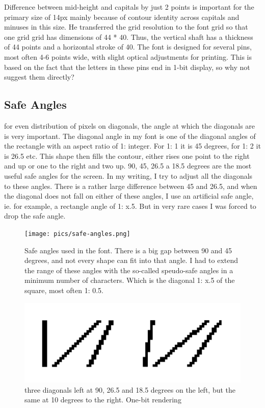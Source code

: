 \documentclass[a4paper]{article}
\begin{document}
Difference between mid-height and capitals by just 2 points is important for the primary size of 14px mainly because of contour identity across capitals and minuses in this size. He transferred the grid resolution to the font grid so that one grid grid has dimensions of 44 * 40. Thus, the vertical shaft has a thickness of 44 points and a horizontal stroke of 40. The font is designed for several pins, most often 4-6 points wide, with slight optical adjustments for printing. This is based on the fact that the letters in these pins end in 1-bit display, so why not suggest them directly?
\subsection {Safe Angles}
for even distribution of pixels on diagonals, the angle at which the diagonals are is very important. The diagonal angle in my font is one of the diagonal angles of the rectangle with an aspect ratio of 1: integer. For 1: 1 it is 45 degrees, for 1: 2 it is 26.5 etc. This shape then fills the contour, either rises one point to the right and up or one to the right and two up.
90,
45,
26.5 a
18.5 degrees are the most useful safe angles for the screen. In my writing, I try to adjust all the diagonals to these angles. There is a rather large difference between 45 and 26.5, and when the diagonal does not fall on either of these angles, I use an artificial safe angle, ie. for example, a rectangle angle of 1: x.5. But in very rare cases I was forced to drop the safe angle.

\begin{figure} [H]
  \texttt{[image: pics/safe-angles.png]}
  \caption {Safe angles used in the font. There is a big gap between 90 and 45 degrees, and not every shape can fit into that angle. I had to extend the range of these angles with the so-called speudo-safe angles in a minimum number of characters. Which is the diagonal 1: x.5 of the square, most often 1: 0.5.}
\end{figure}

\begin{figure} [H]
  \includegraphics [width =\linewidth] {pics/1bit.png}
  \caption {three diagonals left at 90, 26.5 and 18.5 degrees on the left, but the same at 10 degrees to the right. One-bit rendering}
\end{figure}
\end{document}
